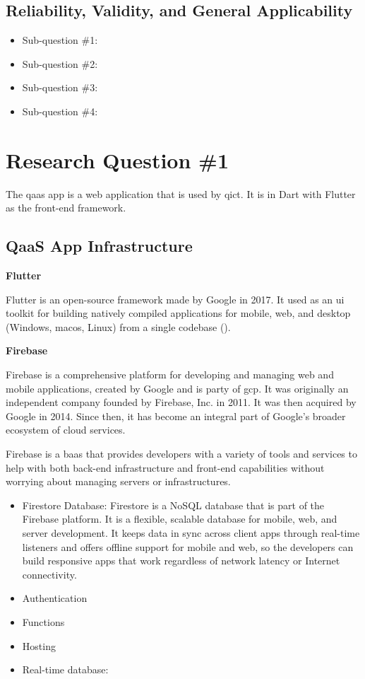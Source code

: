 \begin{multicols}{2}
      \subsection{Reliability, Validity, and General Applicability}
      \begin{itemize}[label=-]
            \item Sub-question \#1:
            \item Sub-question \#2:
            \item Sub-question \#3:
            \item Sub-question \#4:
      \end{itemize}
      \section{Research Question \#1}
      The \acrshort{qaas} app is a web application that is used by \acrshort{qict}. It is in Dart with Flutter as
      the front-end framework.

      \subsection{QaaS App Infrastructure}
      \textbf{Flutter}

      Flutter is an open-source framework made by Google in 2017. It used as an \acrshort{ui} toolkit for building
      natively compiled applications for mobile, web, and desktop (Windows, mac\acrshort{os}, Linux) from a single
      codebase (\cite{flutter}).

      \textbf{Firebase}

      Firebase is a comprehensive platform for developing and managing web and mobile applications, created by
      Google and is party of \acrshort{gcp}. It was originally an independent company founded by Firebase, Inc.
      in 2011. It was then acquired by Google in 2014. Since then, it has become an integral part of Google's
      broader ecosystem of cloud services.

      Firebase is a \acrshort{baas} that provides developers with a variety of tools and services to help with both
      back-end infrastructure and front-end capabilities without worrying about managing servers or infrastructures.
      \begin{itemize}
            \item Firestore Database: Firestore is a NoSQL database that is part of the Firebase platform. It is a
                  flexible, scalable database for mobile, web, and server development. It keeps data in sync across
                  client apps through real-time listeners and offers offline support for mobile and web, so the
                  developers can build responsive apps that work regardless of network latency or Internet
                  connectivity.
            \item Authentication
            \item Functions
            \item Hosting
            \item Real-time database:
      \end{itemize}


\end{multicols}
